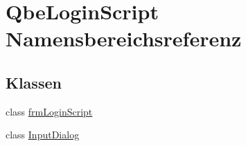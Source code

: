 \hypertarget{namespaceQbeLoginScript}{
\section{Qbe\-Login\-Script Namensbereichsreferenz}
\label{namespaceQbeLoginScript}
}




\subsection*{Klassen}
\begin{CompactItemize}
\item 
class \hyperlink{classQbeLoginScript_1_1frmLoginScript}{frm\-Login\-Script}
\item 
class \hyperlink{classQbeLoginScript_1_1InputDialog}{Input\-Dialog}
\end{CompactItemize}
